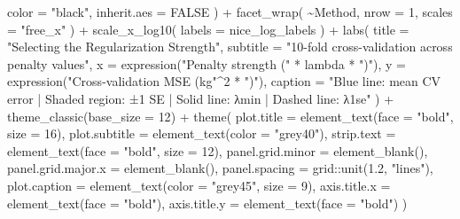 \documentclass[
  letterpaper,
  DIV=11,
  numbers=noendperiod]{scrreprt}
\newenvironment{Shaded}{\begin{snugshade}}{\end{snugshade}}
\newcommand{\AttributeTok}[1]{\textcolor[rgb]{0.40,0.45,0.13}{#1}}
\newcommand{\ConstantTok}[1]{\textcolor[rgb]{0.56,0.35,0.01}{#1}}
\newcommand{\DecValTok}[1]{\textcolor[rgb]{0.68,0.00,0.00}{#1}}
\newcommand{\FloatTok}[1]{\textcolor[rgb]{0.68,0.00,0.00}{#1}}
\newcommand{\FunctionTok}[1]{\textcolor[rgb]{0.28,0.35,0.67}{#1}}
\newcommand{\NormalTok}[1]{\textcolor[rgb]{0.00,0.23,0.31}{#1}}
\newcommand{\SpecialCharTok}[1]{\textcolor[rgb]{0.37,0.37,0.37}{#1}}
\newcommand{\StringTok}[1]{\textcolor[rgb]{0.13,0.47,0.30}{#1}}
\begin{document}
\begin{Shaded}
\begin{Highlighting}[]
    \AttributeTok{color =} \StringTok{"black"}\NormalTok{,}
    \AttributeTok{inherit.aes =} \ConstantTok{FALSE}
\NormalTok{  ) }\SpecialCharTok{+}
  \FunctionTok{facet\_wrap}\NormalTok{(}
    \SpecialCharTok{\textasciitilde{}}\NormalTok{Method,}
    \AttributeTok{nrow =} \DecValTok{1}\NormalTok{,}
    \AttributeTok{scales =} \StringTok{"free\_x"}
\NormalTok{  ) }\SpecialCharTok{+}
  \FunctionTok{scale\_x\_log10}\NormalTok{(}
    \AttributeTok{labels =}\NormalTok{ nice\_log\_labels}
\NormalTok{  ) }\SpecialCharTok{+}
  \FunctionTok{labs}\NormalTok{(}
    \AttributeTok{title =} \StringTok{"Selecting the Regularization Strength"}\NormalTok{,}
    \AttributeTok{subtitle =} \StringTok{"10{-}fold cross{-}validation across penalty values"}\NormalTok{,}
    \AttributeTok{x =} \FunctionTok{expression}\NormalTok{(}\StringTok{"Penalty strength ("} \SpecialCharTok{*}\NormalTok{ lambda }\SpecialCharTok{*} \StringTok{")"}\NormalTok{),}
    \AttributeTok{y =} \FunctionTok{expression}\NormalTok{(}\StringTok{"Cross{-}validation MSE (kg"}\SpecialCharTok{\^{}}\DecValTok{2} \SpecialCharTok{*} \StringTok{")"}\NormalTok{),}
    \AttributeTok{caption =} \StringTok{"Blue line: mean CV error | Shaded region: ±1 SE | Solid line: λmin | Dashed line: λ1se"}
\NormalTok{  ) }\SpecialCharTok{+}
  \FunctionTok{theme\_classic}\NormalTok{(}\AttributeTok{base\_size =} \DecValTok{12}\NormalTok{) }\SpecialCharTok{+}
  \FunctionTok{theme}\NormalTok{(}
    \AttributeTok{plot.title =} \FunctionTok{element\_text}\NormalTok{(}\AttributeTok{face =} \StringTok{"bold"}\NormalTok{, }\AttributeTok{size =} \DecValTok{16}\NormalTok{),}
    \AttributeTok{plot.subtitle =} \FunctionTok{element\_text}\NormalTok{(}\AttributeTok{color =} \StringTok{"grey40"}\NormalTok{),}
    \AttributeTok{strip.text =} \FunctionTok{element\_text}\NormalTok{(}\AttributeTok{face =} \StringTok{"bold"}\NormalTok{, }\AttributeTok{size =} \DecValTok{12}\NormalTok{),}
    \AttributeTok{panel.grid.minor =} \FunctionTok{element\_blank}\NormalTok{(),}
    \AttributeTok{panel.grid.major.x =} \FunctionTok{element\_blank}\NormalTok{(),}
    \AttributeTok{panel.spacing =}\NormalTok{ grid}\SpecialCharTok{::}\FunctionTok{unit}\NormalTok{(}\FloatTok{1.2}\NormalTok{, }\StringTok{"lines"}\NormalTok{),}
    \AttributeTok{plot.caption =} \FunctionTok{element\_text}\NormalTok{(}\AttributeTok{color =} \StringTok{"grey45"}\NormalTok{, }\AttributeTok{size =} \DecValTok{9}\NormalTok{),}
    \AttributeTok{axis.title.x =} \FunctionTok{element\_text}\NormalTok{(}\AttributeTok{face =} \StringTok{"bold"}\NormalTok{),}
    \AttributeTok{axis.title.y =} \FunctionTok{element\_text}\NormalTok{(}\AttributeTok{face =} \StringTok{"bold"}\NormalTok{)}
\NormalTok{  )}
\end{Highlighting}
\end{Shaded}
\end{document}
